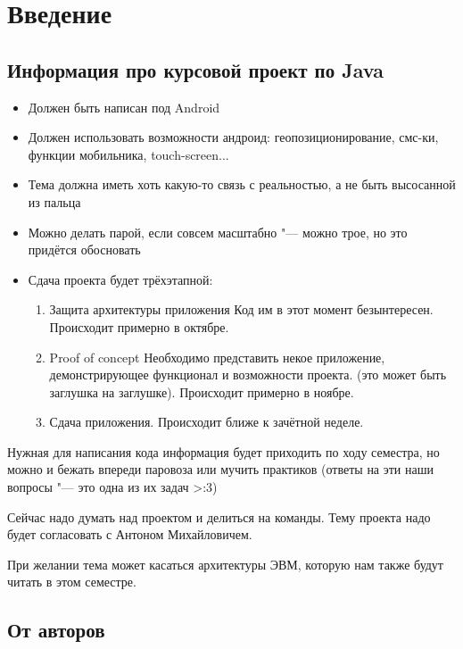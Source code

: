 \chapter{Введение}

\section{Информация про курсовой проект по Java}

\begin{itemize}
\item
	Должен быть написан под Android

\item
	Должен использовать возможности андроид: геопозиционирование, смс-ки, функции мобильника, touch-screen...

\item
	Тема должна иметь хоть какую-то связь с реальностью, а не быть высосанной из пальца

\item
	Можно делать парой, если совсем масштабно "--- можно трое, но это придётся обосновать

\item
	Сдача проекта будет трёхэтапной:
	\begin{enumerate}
	\item
		Защита архитектуры приложения
		Код им в этот момент безынтересен.
		Происходит примерно в октябре.

	\item
		Proof of concept
		Необходимо представить некое приложение, демонстрирующее функционал и возможности проекта.
		(это может быть заглушка на заглушке).
		Происходит примерно в ноябре.

	\item
		Сдача приложения.
		Происходит ближе к зачётной неделе.
	\end{enumerate}
\end{itemize}

Нужная для написания кода информация будет приходить по ходу семестра,
но можно и бежать впереди паровоза или мучить практиков
(ответы на эти наши вопросы "--- это одна из их задач >:3)

Сейчас надо думать над проектом и делиться на команды.
Тему проекта надо будет согласовать с Антоном Михайловичем.

При желании тема может касаться архитектуры ЭВМ, которую нам также будут читать в этом семестре.

\section{От авторов}


